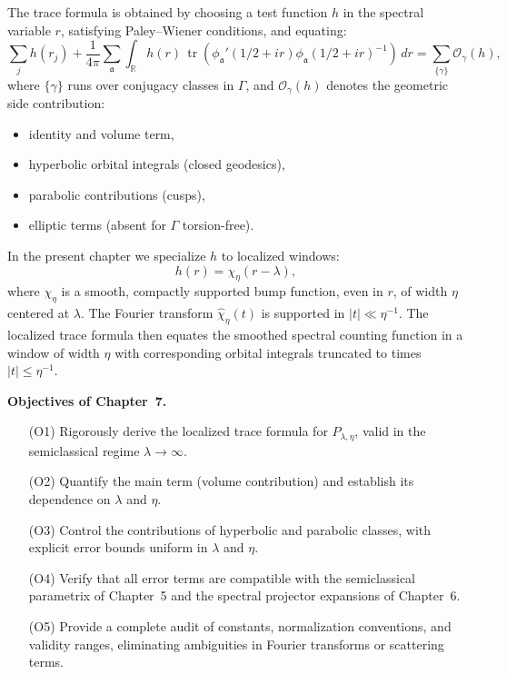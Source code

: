 \noindent
The trace formula is obtained by choosing a test function $h$ in the spectral variable $r$,
satisfying Paley–Wiener conditions, and equating:
\begin{equation}\label{eq:trace-formula}
  \sum_{j} h(r_j) + \frac{1}{4\pi}\sum_{\mathfrak{a}}\int_{\mathbb{R}} h(r)\,
  \operatorname{tr}\left(\phi_\mathfrak{a}'(1/2+ir)\phi_\mathfrak{a}(1/2+ir)^{-1}\right)\,dr
  = \sum_{\{\gamma\}}\mathcal{O}_\gamma(h),
\end{equation}
where $\{\gamma\}$ runs over conjugacy classes in $\Gamma$,
and $\mathcal{O}_\gamma(h)$ denotes the geometric side contribution:
\begin{itemize}
  \item identity and volume term,
  \item hyperbolic orbital integrals (closed geodesics),
  \item parabolic contributions (cusps),
  \item elliptic terms (absent for $\Gamma$ torsion-free).
\end{itemize}

\medskip

\noindent
In the present chapter we specialize $h$ to localized windows:
\[
  h(r) = \chi_\eta(r-\lambda),
\]
where $\chi_\eta$ is a smooth, compactly supported bump function,
even in $r$, of width $\eta$ centered at $\lambda$.
The Fourier transform $\widehat{\chi}_\eta(t)$ is supported in $|t|\ll \eta^{-1}$.
The localized trace formula then equates the smoothed spectral counting function
in a window of width $\eta$ with corresponding orbital integrals
truncated to times $|t|\le \eta^{-1}$.

\medskip

\noindent
\textbf{Objectives of Chapter~7.}
\begin{itemize}
  \item[(O1)] Rigorously derive the localized trace formula for $P_{\lambda,\eta}$,
  valid in the semiclassical regime $\lambda\to\infty$.
  \item[(O2)] Quantify the main term (volume contribution) and establish its dependence on $\lambda$ and $\eta$.
  \item[(O3)] Control the contributions of hyperbolic and parabolic classes,
  with explicit error bounds uniform in $\lambda$ and $\eta$.
  \item[(O4)] Verify that all error terms are compatible with the semiclassical parametrix
  of Chapter~5 and the spectral projector expansions of Chapter~6.
  \item[(O5)] Provide a complete audit of constants, normalization conventions,
  and validity ranges, eliminating ambiguities in Fourier transforms or scattering terms.
\end{itemize}

